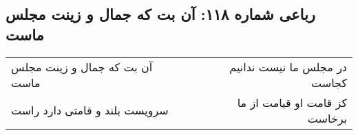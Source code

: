 \begin{center}
\section*{رباعی شماره ۱۱۸: آن بت که جمال و زینت مجلس ماست}
\label{sec:0118}
\begin{longtable}{l p{0.5cm} r}
آن بت که جمال و زینت مجلس ماست
&&
در مجلس ما نیست ندانیم کجاست
\\
سرویست بلند و قامتی دارد راست
&&
کز قامت او قیامت از ما برخاست
\\
\end{longtable}
\end{center}
